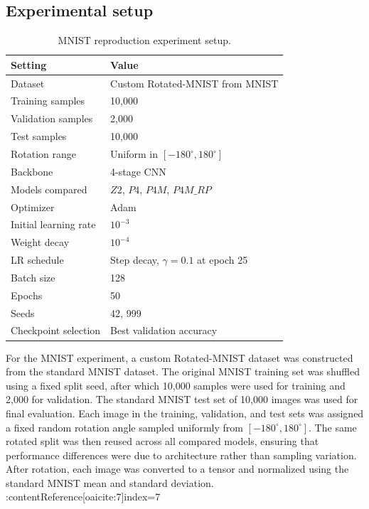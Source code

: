\documentclass{article}
\begin{document}
\subsection{Experimental setup}

\begin{table}[h]
\centering
\caption{MNIST reproduction experiment setup.}
\label{tab:mnist_setup}
\begin{tabular}{ll}
\hline
Setting & Value \\
\hline
Dataset & Custom Rotated-MNIST from MNIST \\
Training samples & 10{,}000 \\
Validation samples & 2{,}000 \\
Test samples & 10{,}000 \\
Rotation range & Uniform in $[-180^\circ, 180^\circ]$ \\
Backbone & 4-stage CNN \\
Models compared & $Z2$, $P4$, $P4M$, $P4M\_RP$ \\
Optimizer & Adam \\
Initial learning rate & $10^{-3}$ \\
Weight decay & $10^{-4}$ \\
LR schedule & Step decay, $\gamma=0.1$ at epoch 25 \\
Batch size & 128 \\
Epochs & 50 \\
Seeds & 42, 999 \\
Checkpoint selection & Best validation accuracy \\
\hline
\end{tabular}
\end{table}

For the MNIST experiment, a custom Rotated-MNIST dataset was constructed from the standard MNIST dataset. The original MNIST training set was shuffled using a fixed split seed, after which 10,000 samples were used for training and 2,000 for validation. The standard MNIST test set of 10,000 images was used for final evaluation. Each image in the training, validation, and test sets was assigned a fixed random rotation angle sampled uniformly from $[-180^\circ, 180^\circ]$. The same rotated split was then reused across all compared models, ensuring that performance differences were due to architecture rather than sampling variation. After rotation, each image was converted to a tensor and normalized using the standard MNIST mean and standard deviation. :contentReference[oaicite:7]{index=7}
\end{document}
